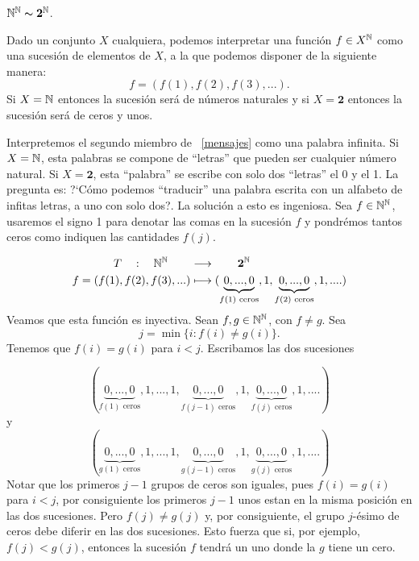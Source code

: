 \begin{proposicion} $\nn^{\nn}\thicksim\mathbf{2}^{\nn}$.
\end{proposicion}

\begin{demo} Dado un conjunto $X$ cualquiera, podemos interpretar una
funci\'on $f\in X^{\nn}$ como una sucesi\'on de elementos de $X$,
a la que podemos disponer de la siguiente manera:
\begin{equation}\label{mensajes}
     f=(f(1),f(2),f(3),...).
\end{equation}
Si $X=\nn$ entonces la sucesi\'on ser\'a de n\'umeros naturales y
si $X=\mathbf{2}$ entonces la sucesi\'on ser\'a de ceros y unos.

Interpretemos el segundo miembro de ~\eqref{mensajes}  como una
palabra infinita. Si $X=\nn$, esta palabras se compone de
``letras'' que pueden ser cualquier n\'umero natural. Si
$X=\mathbf{2}$, esta ``palabra'' se escribe con solo dos
``letras'' el 0 y el 1. La pregunta es: ?`C\'omo podemos
``traducir'' una palabra escrita con un alfabeto de infitas
letras, a uno con solo dos?. La soluci\'on a esto es ingeniosa.
Sea $f\in\nn^{\nn}$, usaremos el signo 1 para denotar las comas en
la sucesi\'on $f$ y pondr\'emos tantos ceros como indiquen las
cantidades $f(j)$.


\[
  \begin{split}
         T\quad:\quad\nn^{\nn}\quad\quad &\longrightarrow\quad\quad\mathbf{2}^{\nn}\\
         f=(f(1),f(2),f(3),...)&\longmapsto
          (\underbrace{0,...,0}_{f(1)\,\,\text{ceros}},1,
          \underbrace{0,...,0}_{f(2)\,\,\text{ceros}},1,....)\\
 \end{split}
\]
Veamos que esta funci\'on es inyectiva. Sean $f,g\in\nn^{\nn}$,
con  $f\neq g$. Sea
\[j=\min\{i:f(i)\neq g(i)\}.\]
Tenemos que $f(i)=g(i)$ para $i<j$. Escribamos las dos sucesiones

\[   (\underbrace{0,...,0}_{f(1)\,\,\text{ceros}},1,
         ...,1,\underbrace{0,...,0}_{f(j-1)
          \,\,\text{ceros}},1, \underbrace{0,...,0}_{f(j)\,\,\text{ceros}},1,....)
\]
y
\[   (\underbrace{0,...,0}_{g(1)\,\,\text{ceros}},1,
         ...,1,\underbrace{0,...,0}_{g(j-1)
          \,\,\text{ceros}},1, \underbrace{0,...,0}_{g(j)\,\,\text{ceros}},1,....)
\]
Notar que los primeros $j-1$ grupos de ceros son iguales, pues
$f(i)=g(i)$ para $i<j$, por consiguiente los primeros $j-1$ unos
estan en la misma posici\'on en las dos sucesiones. Pero $f(j)\neq
g(j)$ y, por consiguiente, el grupo $j$-\'esimo de ceros debe
diferir en las dos sucesiones. Esto fuerza que si, por ejemplo,
$f(j)<g(j)$, entonces la sucesi\'on $f$ tendr\'a un uno donde la
$g$ tiene un cero.


\end{demo}
